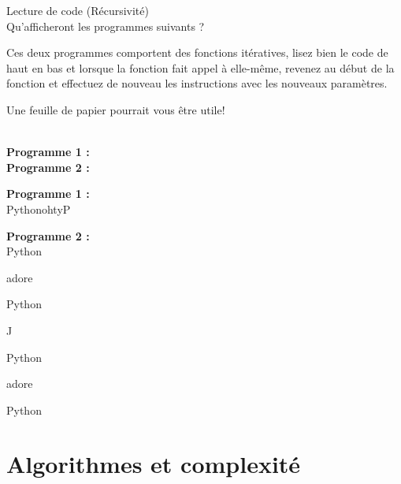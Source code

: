 \begin{Exercice}[5 minutes] Lecture de code (Récursivité)\\

Qu'afficheront les programmes suivants ? \\

\begin{conseil}
   Ces deux programmes comportent des fonctions itératives, lisez bien le code de haut en bas et lorsque la fonction fait appel à elle-même, revenez au début de la fonction et effectuez de nouveau les instructions avec les nouveaux paramètres.
   
   Une feuille de papier pourrait vous être utile!\\
\end{conseil}

\textbf{\\Programme 1 :} \\

     

\textbf{Programme 2 :} \\

    

    
\begin{solution}
    \textbf{Programme 1 :} \\

    PythonohtyP
    
\end{solution}


\begin{solution}   
    \textbf{Programme 2 :} \\

    Python
    
    adore
    
    Python
    
    J
    
    Python
    
    adore
    
    Python
    
\end{solution}

\end{Exercice}

\section{Algorithmes et complexité}


